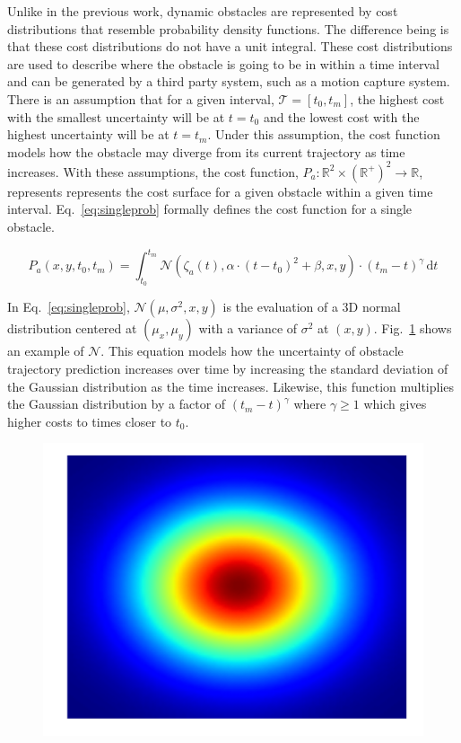 Unlike in the previous work, dynamic obstacles are represented by cost
distributions that resemble probability density functions. The difference being
is that these cost distributions do not have a unit integral. These cost
distributions are used to describe where the obstacle is going to be in within
a time interval and can be generated by a third party system, such as a motion
capture system. There is an assumption that for a given interval, $\mathcal{T}
= [t_0, t_m]$, the highest cost with the smallest uncertainty will be at $t =
t_0$ and the lowest cost with the highest uncertainty will be at $t = t_m$.
Under this assumption, the cost function models how the obstacle may diverge
from its current trajectory as time increases. With these assumptions, the cost
function, $P_a: \mathbb{R}^2 \times (\mathbb{R}^+)^2 \rightarrow
\mathbb{R}$, represents represents the cost surface for a given
obstacle within a given time interval. Eq.~\ref{eq:singleprob} formally defines
the cost function for a single obstacle.


\begin{equation}
    P_a(x, y, t_0, t_m) = \int^{t_m}_{t_0}
    \mathcal{N}(\zeta_a(t), \alpha \cdot (t - t_0)^2 + \beta, x, y) \cdot
    (t_m - t)^{\gamma} \,\mathrm{d}t
    \label{eq:singleprob}
\end{equation}

In Eq.~\ref{eq:singleprob}, $\mathcal{N}(\mu, \sigma^2, x, y)$ is the
evaluation of a 3D normal distribution centered at $(\mu_x, \mu_y)$ with a
variance of $\sigma^2$ at $(x, y)$. Fig.~\ref{fig:normal_3d} shows an example
of $\mathcal{N}$. This equation models how the uncertainty of obstacle
trajectory prediction increases over time by increasing the standard deviation
of the Gaussian distribution as the time increases.  Likewise, this function
multiplies the Gaussian distribution by a factor of $(t_m - t)^{\gamma}$ where
$\gamma \geq 1$ which gives higher costs to times closer to $t_0$.

\begin{figure}[h!]
    \centering
    \includegraphics[width=0.60\linewidth]{figs/normal_3d}
    \caption{}
    \label{fig:normal_3d}
\end{figure}

